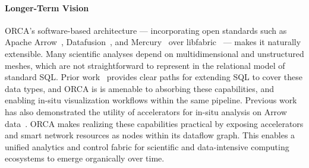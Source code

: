 \paragraph{Longer-Term Vision}
ORCA's software-based architecture --- incorporating open standards such as Apache
Arrow~\cite{:ApacheArrow}, Datafusion~\cite{Lamb2024:DataFusion}, and
Mercury~\cite{Souma2013:MercuryRPC} over libfabric~\cite{Grun2015:Libfabric} --- makes it naturally
extensible.
Many scientific analyses depend on multidimensional and unstructured meshes, which are not
straightforward to represent in the relational model of standard SQL.
Prior work~\cite{:TileDB,Lee2004:MeshSQL,Kerst2011:SciQL,Rezae2014:UnstructuredMeshAlgebra}
provides clear paths for extending SQL to cover these data types, and ORCA is is amenable to
absorbing these capabilities, and enabling in-situ visualization workflows within the same
pipeline.
Previous work has also demonstrated the utility of accelerators for in-situ analysis on Arrow
data~\cite{Liu2022:ProcessingParticleData, Ulmer2023:ExtendingComposableData}.
ORCA makes realizing these capabilities practical by exposing accelerators and smart network
resources as nodes within its dataflow graph.
This enables a unified analytics and control fabric for scientific and data-intensive computing
ecosystems to emerge organically over time.
